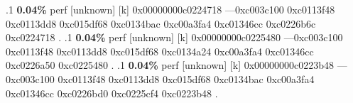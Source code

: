 \begin{profile}
{.1 \textbf{ 0.04\%} perf             [unknown]              [k] 0x00000000c0224718\newline {} ---0xc003c100\newline {} 0xc0113f48\newline {} 0xc0113dd8\newline {} 0xc015df68\newline {} 0xc0134bac\newline {} 0xc00a3fa4\newline {} 0xc01346cc\newline {} 0xc0226b6c\newline {} 0xc0224718\newline {} . 
.1 \textbf{ 0.04\%} perf             [unknown]              [k] 0x00000000c0225480\newline {} ---0xc003c100\newline {} 0xc0113f48\newline {} 0xc0113dd8\newline {} 0xc015df68\newline {} 0xc0134a24\newline {} 0xc00a3fa4\newline {} 0xc01346cc\newline {} 0xc0226a50\newline {} 0xc0225480\newline {} . 
.1 \textbf{ 0.04\%} perf             [unknown]              [k] 0x00000000c0223b48\newline {} ---0xc003c100\newline {} 0xc0113f48\newline {} 0xc0113dd8\newline {} 0xc015df68\newline {} 0xc0134bac\newline {} 0xc00a3fa4\newline {} 0xc01346cc\newline {} 0xc0226bd0\newline {} 0xc0225cf4\newline {} 0xc0223b48\newline {} . 
}
\end{profile}
